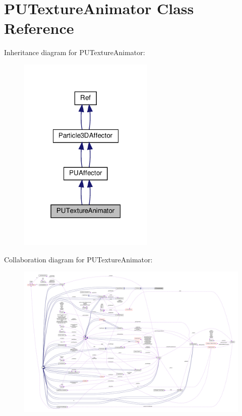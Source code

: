\hypertarget{classPUTextureAnimator}{}\section{P\+U\+Texture\+Animator Class Reference}
\label{classPUTextureAnimator}


Inheritance diagram for P\+U\+Texture\+Animator\+:
\nopagebreak
\begin{figure}[H]
\begin{center}
\leavevmode
\includegraphics[width=183pt]{classPUTextureAnimator__inherit__graph}
\end{center}
\end{figure}


Collaboration diagram for P\+U\+Texture\+Animator\+:
\nopagebreak
\begin{figure}[H]
\begin{center}
\leavevmode
\includegraphics[width=350pt]{classPUTextureAnimator__coll__graph}
\end{center}
\end{figure}
